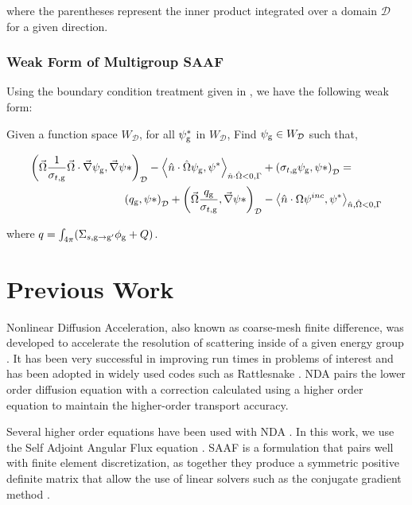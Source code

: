 where the parentheses represent the inner product integrated over a domain $\mathcal{D}$ for a given direction.

\subsubsection{Weak Form of Multigroup SAAF}
Using the boundary condition treatment given in \cite{zheng-thesis}, we have the following weak form:

Given a function space $W_\mathcal{D}$, for all $\psi^*_{\mathrm{g}}$ in $W_\mathcal{D}$, Find $\psi_{\mathrm{g}} \in W_\mathcal{D}$ such that,

\begin{equation}
\begin{split}

        \left ( \vec{\Omega}\frac{1}{\sigma_{t, \rg}}\vec{\Omega}\cdot \vec{\nabla}\psi_\rg, \vec{\nabla}\psi* \right)_\mathcal{D} -     \left < \hat{n} \cdot \hat{\Omega}\psi_\rg, \psi^* \right>_{\hat{n} \cdot \hat{\Omega} < 0, \Gamma} &+ \left ( \sigma_{t, \rg} \psi_\rg, \psi* \right )_\mathcal{D} = \\
        \left ( q_\rg, \psi* \right)_\mathcal{D} + \left ( \vec{\Omega} \frac{q_\rg}{\sigma_{t, \rg}}, \vec{\nabla}\psi* \right)_\mathcal{D} &- \left < \hat{n} \cdot {\Omega} \psi^{inc}, \psi^* \right>_{\hat{n}, \hat{\Omega} <0, \Gamma} 
    \end{split}
\end{equation}

where $q = \int_{4\pi}(\Sigma_{s, \mathrm{g} \rightarrow \mathrm{g}'}\phi_{\mathrm{g}} + Q)$. 
\

\section{Previous Work}

Nonlinear Diffusion Acceleration, also known as coarse-mesh finite difference, was developed to accelerate the resolution of scattering inside of a given energy group \cite{Knoll2011} \cite{park-nda}. It has been very successful in improving run times in problems of interest and has been adopted in widely used codes such as Rattlesnake \cite{Wang2013, Schunert2017, morel-holo}. NDA pairs the lower order diffusion equation with a correction calculated using a higher order equation to maintain the higher-order transport accuracy. 

Several higher order equations have been used with NDA \cite{morel-holo, Wang2013}. In this work, we use the Self Adjoint Angular Flux equation \cite{saaf}. SAAF is a formulation that pairs well with finite element discretization, as together they produce a symmetric positive definite matrix that allow the use of linear solvers such as the conjugate gradient method \cite{Shewchuck1994}.

